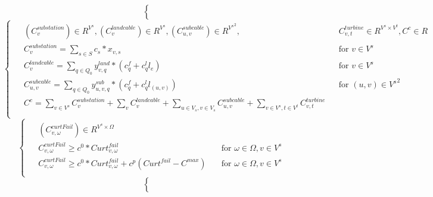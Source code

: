 \documentclass[a4paper,12pt]{article}
\begin{document}
\begin {enumerate}
{\begin{equation}
\begin{cases}
\begin{alignedat}{2}
            \end{alignedat}
        \end{cases}
    \end{equation}
    \begin{equation}
        \begin{cases}
            \begin{alignedat} {2}
                & (C_{v}^{substation}) \in R^{V^{s}}, (C_{v}^{landcable}) \in R^{V^{s}}, (C_{u,v}^{subcable}) \in R^{{V^{s}}^{2}},&& C_{v,t}^{turbine} \in R^{V^{s} \times V^{t}}, C^{c} \in R \\
                & C_{v}^{substation} = \sum_{s \in S} c_{s} * x_{v, s} && \text{for }  v \in V^{s} \\
                & C_{v}^{landcable} = \sum_{q \in Q_0} y_{v,q}^{land}*(c_{q}^{f} + c_{q}^{l} l_{e}) && \text{for }  v \in V^{s} \\
                & C_{u,v}^{subcable} = \sum_{q \in Q_0} y_{u,v,q}^{sub} * (c_{q}^{f}+c_{q}^{l} l_{(u,v)}) && \text{for }  (u,v) \in {V^{s}}^{2} \\
                & C^{c} = \sum_{v \in V^s} C_{v}^{substation} + \sum_{v} C_{v}^{landcable} + \sum_{u \in V_{s},v \in V_{s}} C_{u,v}^{subcable} + \sum_{v \in V^s, t \in V^{t}} C_{v,t}^{turbine} \\
            \end{alignedat}
        \end{cases}
    \end{equation}
    \begin{equation}
        \begin{cases}
            \begin{alignedat}{2}
                & (C_{v,\omega}^{curtFail}) \in R^{V^{s} \times \Omega} \\
                & C_{v,\omega}^{curtFail} \geq c^{0}*Curt_{v,\omega}^{fail} & \quad  \text{for } \omega \in\Omega, v \in V^{s} \\
                & C_{v,\omega}^{curtFail} \geq c^{0}*Curt_{v,\omega}^{fail} + c^{p}(Curt^{fail}-C^{max}) & \quad  \text{for } \omega \in\Omega, v \in V^{s} \\
            \end{alignedat}
        \end{cases}
    \end{equation}
    \begin{equation}
        \begin{cases}
            \begin{alignedat}{2}

\end{alignedat}
\end{cases}
\end{equation}}
\end{enumerate}
\end{document}

